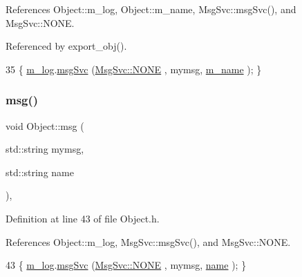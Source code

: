References Object\+::m\+\_\+log, Object\+::m\+\_\+name, Msg\+Svc\+::msg\+Svc(), and Msg\+Svc\+::\+N\+O\+NE.



Referenced by export\+\_\+obj().


\begin{DoxyCode}
35 \{ \hyperlink{classObject_a0d269813dd7ac1f24bc143031e2963f2}{m\_log}.\hyperlink{classMsgSvc_ad25f18047920cc59a314e5098259711c}{msgSvc} (\hyperlink{classMsgSvc_ae671eb7301996cd049d2da8a65925926a9be9ae32fed8e1e6eba4a58692210fbd}{MsgSvc::NONE}    , mymsg, \hyperlink{classObject_a8b83c95c705d2c3ba0d081fe1710f48d}{m\_name} ); \}
\end{DoxyCode}
\mbox{\label{classObject_ac5d59299273cee27aacf7de00d2e7034}} 
\subsubsection{\texorpdfstring{msg()}{msg()}\hspace{0.1cm}{\footnotesize\ttfamily [2/2]}}
{\footnotesize\ttfamily void Object\+::msg (\begin{DoxyParamCaption}\item[{std\+::string}]{mymsg,  }\item[{std\+::string}]{name }\end{DoxyParamCaption})\hspace{0.3cm}{\ttfamily [inline]}, {\ttfamily [inherited]}}



Definition at line 43 of file Object.\+h.



References Object\+::m\+\_\+log, Msg\+Svc\+::msg\+Svc(), and Msg\+Svc\+::\+N\+O\+NE.


\begin{DoxyCode}
43 \{ \hyperlink{classObject_a0d269813dd7ac1f24bc143031e2963f2}{m\_log}.\hyperlink{classMsgSvc_ad25f18047920cc59a314e5098259711c}{msgSvc} (\hyperlink{classMsgSvc_ae671eb7301996cd049d2da8a65925926a9be9ae32fed8e1e6eba4a58692210fbd}{MsgSvc::NONE}    , mymsg, \hyperlink{classObject_a300f4c05dd468c7bb8b3c968868443c1}{name} ); \}
\end{DoxyCode}
\mbox{\label{classObject_a3f9d5537ebce0c0f2bf6ae4d92426f3c}} 
